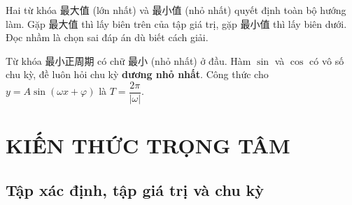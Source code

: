 \documentclass[11pt, a4paper]{article}
\begin{document}
 Hai từ khóa 最大值 (lớn nhất) và 最小值 (nhỏ nhất) quyết định toàn bộ hướng làm. Gặp 最大值 thì lấy biên trên của tập giá trị, gặp 最小值 thì lấy biên dưới. Đọc nhầm là chọn sai đáp án dù biết cách giải.

 Từ khóa 最小正周期 có chữ 最小 (nhỏ nhất) ở đầu. Hàm $\sin$ và $\cos$ có vô số chu kỳ, đề luôn hỏi chu kỳ \textbf{dương nhỏ nhất}. Công thức cho $y = A\sin(\omega x + \varphi)$ là $T = \dfrac{2\pi}{|\omega|}$.

\section{KIẾN THỨC TRỌNG TÂM}

\subsection{Tập xác định, tập giá trị và chu kỳ}
\end{document}

